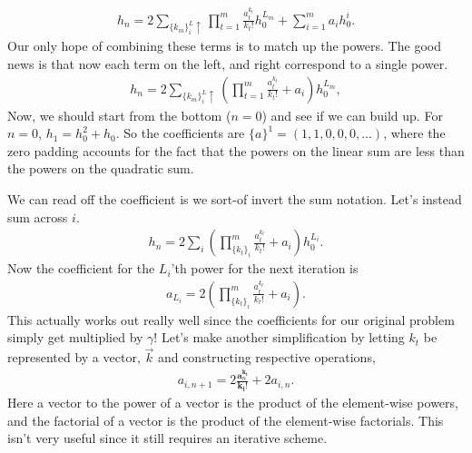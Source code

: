 \documentclass[../../main.tex]{subfiles}
\begin{document}
			\begin{align}
				h_n = 2\sum_{\{k_m\}_i^L\uparrow} \prod_{t=1}^m \frac{a_t^{k_t}}{k_t!} h_0^{L_m} + \sum_{i=1}^m a_i h_0^i.
			\end{align}
			Our only hope of combining these terms is to match up the powers. The good news is that now each term on the left, and right correspond to a single power.
			\begin{align}
				h_n = 2\sum_{\{k_m\}_i^L\uparrow} \left(\prod_{t=1}^m \frac{a_t^{k_t}}{k_t!} + a_i \right) h_0^{L_m},
			\end{align}
			Now, we should start from the bottom ($n=0$) and see if we can build up. For $n=0$, $h_{1}=h_0^2+h_0$. So the coefficients are $\{a\}^1 = (1, 1, 0, 0, 0, ...)$, where the zero padding accounts for the fact that the powers on the linear sum are less than the powers on the quadratic sum.

			We can read off the coefficient is we sort-of invert the sum notation. Let's instead sum across $i$.
			\begin{align}
				h_n = 2\sum_{i} \left(\prod_{\{k_t\}_i}^m \frac{a_t^{k_t}}{k_t!} + a_i \right) h_0^{L_i}.
			\end{align}
			Now the coefficient for the $L_i$'th power for the next iteration is
			\begin{align}
				a_{L_i} = 2\left(\prod_{\{k_t\}_i}^m \frac{a_t^{k_t}}{k_t!} + a_i \right).
			\end{align}
			This actually works out really well since the coefficients for our original problem simply get multiplied by $\gamma$! Let's make another simplification by letting $k_t$ be represented by a vector, $\vec k$ and constructing respective operations,
			\begin{align}
				a_{i, n+1} = 2 \frac{\boldsymbol{a}_n^\boldsymbol{k_i}}{\boldsymbol{k_i}!} + 2a_{i, n}.
			\end{align}
			Here a vector to the power of a vector is the product of the element-wise powers, and the factorial of a vector is the product of the element-wise factorials. This isn't very useful since it still requires an iterative scheme.
\end{document}
